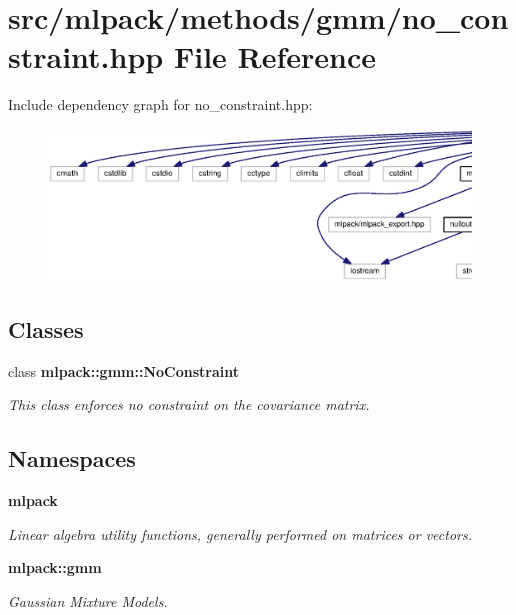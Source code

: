 \section{src/mlpack/methods/gmm/no\+\_\+constraint.hpp File Reference}
\label{no__constraint_8hpp}
Include dependency graph for no\+\_\+constraint.\+hpp\+:
\nopagebreak
\begin{figure}[H]
\begin{center}
\leavevmode
\includegraphics[width=350pt]{no__constraint_8hpp__incl}
\end{center}
\end{figure}
\subsection*{Classes}
\begin{DoxyCompactItemize}
\item 
class {\bf mlpack\+::gmm\+::\+No\+Constraint}
\begin{DoxyCompactList}\small\item\em This class enforces no constraint on the covariance matrix. \end{DoxyCompactList}\end{DoxyCompactItemize}
\subsection*{Namespaces}
\begin{DoxyCompactItemize}
\item 
 {\bf mlpack}
\begin{DoxyCompactList}\small\item\em Linear algebra utility functions, generally performed on matrices or vectors. \end{DoxyCompactList}\item 
 {\bf mlpack\+::gmm}
\begin{DoxyCompactList}\small\item\em Gaussian Mixture Models. \end{DoxyCompactList}\end{DoxyCompactItemize}


